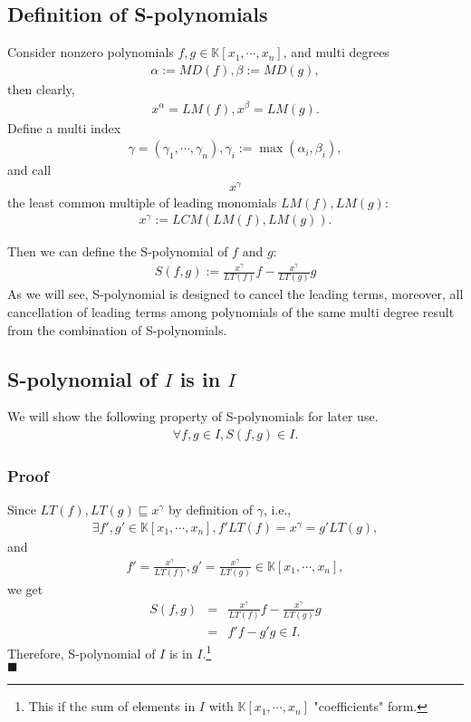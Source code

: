 \documentclass[11pt]{book}
\begin{document}
\subsection{Definition of S-polynomials}
Consider nonzero polynomials $f,g \in \mathbb{K}[x_1, \cdots, x_n]$, and multi degrees
\begin{eqnarray}
\alpha := MD(f), \beta := MD(g),
\end{eqnarray}
then clearly,
\begin{eqnarray}
x^\alpha = LM(f), x^\beta = LM(g).
\end{eqnarray}
Define a multi index
\begin{eqnarray}
\gamma = (\gamma_1, \cdots, \gamma_n), \gamma_i := \max(\alpha_i, \beta_i),
\end{eqnarray}
and call
\begin{eqnarray}
x^\gamma 
\end{eqnarray}
the least common multiple of leading monomials $LM(f), LM(g)$:
\begin{eqnarray}
x^\gamma := LCM\left( LM(f), LM(g) \right).
\end{eqnarray}

Then we can define the S-polynomial of $f$ and $g$:
\begin{eqnarray}
S(f,g) := \frac{x^\gamma}{LT(f)} f - \frac{x^\gamma}{LT(g)} g 
\end{eqnarray}
As we will see, S-polynomial is designed to cancel the leading terms, moreover, all cancellation of leading terms among polynomials of the same multi degree result from the combination of S-polynomials.

\subsection{S-polynomial of $I$ is in $I$}
\label{SofIisInI}
We will show the following property of S-polynomials for later use.
\begin{eqnarray}
\forall f,g \in I, S(f,g)\in I.
\end{eqnarray}

\subsubsection{Proof}
Since $LT(f), LT(g) \sqsubseteq x^\gamma$ by definition of $\gamma$, i.e.,
\begin{eqnarray}
\exists f',g' \in \mathbb{K}[x_1, \cdots, x_n], f'LT(f) = x^\gamma = g' LT(g),
\end{eqnarray}
and
\begin{eqnarray}
f' = \frac{x^\gamma}{LT(f)}, g' = \frac{x^\gamma}{LT(g)} \in \mathbb{K}[x_1, \cdots, x_n],
\end{eqnarray}
we get
\begin{eqnarray}
S(f, g) &=& \frac{x^\gamma}{LT(f)} f - \frac{x^\gamma}{LT(g)} g \\
&=& f' f - g' g \in I.
\end{eqnarray}
Therefore, S-polynomial of $I$ is in $I$.\footnote{This if the sum of elements in $I$ with $\mathbb{K}[x_1, \cdots, x_n]$ "coefficients" form.}\\
$\blacksquare$
\end{document}
